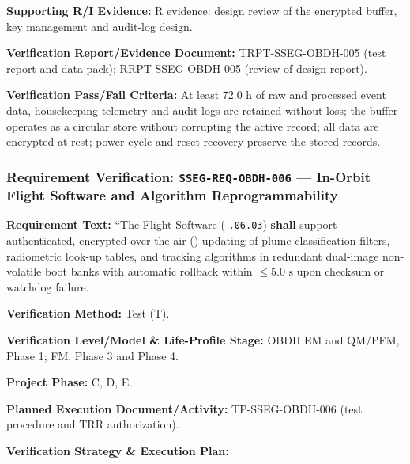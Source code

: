 \par\textbf{Supporting R/I Evidence:} R evidence: design review of the encrypted buffer, key management and audit-log design.
\par\textbf{Verification Report/Evidence Document:} TRPT-SSEG-OBDH-005 (test report and data pack); RRPT-SSEG-OBDH-005 (review-of-design report).
\par\textbf{Verification Pass/Fail Criteria:} At least 72.0 h of raw and processed event data, housekeeping telemetry and audit logs are retained without loss; the buffer operates as a circular store without corrupting the active record; all data are encrypted at rest; power-cycle and reset recovery preserve the stored records.
\par\medskip
\subsubsection{Requirement Verification: \texttt{SSEG-REQ-OBDH-006} --- In-Orbit Flight Software and Algorithm Reprogrammability}
\label{ver:SSEG-REQ-OBDH-006}
\textbf{Requirement Text:} ``The  Flight Software ( \texttt{.06.03}) \textbf{shall} support authenticated, encrypted over-the-air () updating of plume-classification filters, radiometric look-up tables, and tracking algorithms in redundant dual-image non-volatile boot banks with automatic rollback within $\le 5.0\text{ s}$ upon checksum or watchdog failure.
\par\textbf{Verification Method:} Test (T).
\par\textbf{Verification Level/Model \& Life-Profile Stage:} OBDH EM and QM/PFM, Phase 1; FM, Phase 3 and Phase 4.
\par\textbf{Project Phase:} C, D, E.
\par\textbf{Planned Execution Document/Activity:} TP-SSEG-OBDH-006 (test procedure and TRR authorization).
\par\textbf{Verification Strategy \& Execution Plan:}

